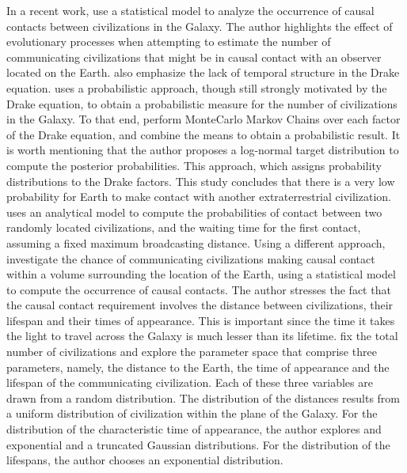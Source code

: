 In a recent work, \citep{balbi_impact_2018} use a statistical model to
analyze the occurrence of causal contacts between civilizations in the
Galaxy.
%
The author highlights the effect of evolutionary processes when
attempting to estimate the number of communicating civilizations that
might be in causal contact with an observer located on the Earth.
%
\citet{cirkovic_temporal_2004} also emphasize the lack of temporal
structure in the Drake equation.
%
\citet{bloetscher_using_2019} uses a probabilistic approach, though
still strongly motivated by the Drake equation, to obtain a
probabilistic measure for the number of civilizations in the Galaxy.
%
To that end, perform MonteCarlo Markov Chains over each factor of the
Drake equation, and combine the means to obtain a probabilistic
result.
%
It is worth mentioning that the author proposes a log-normal target
distribution to compute the posterior probabilities.
%
This approach, which assigns probability distributions to the Drake
factors.
%
This study concludes that there is a very low probability for Earth to
make contact with another extraterrestrial civilization.    
%
\citet{smith_broadcasting_2009} uses an analytical model to compute the
probabilities of contact between two randomly located civilizations,
and the waiting time for the first contact, assuming a fixed maximum
broadcasting distance.
% 
Using a different approach, 
\citet{balbi_impact_2018} investigate the chance of communicating
civilizations making causal contact within a volume surrounding the
location of the Earth, using a statistical model to compute the
occurrence of causal contacts.
%
The author stresses the fact that the
causal contact requirement involves the distance between
civilizations, their lifespan and their times of appearance.  This is
important since the time it takes the light to travel across the
Galaxy is much lesser than its lifetime.
%
\citet{balbi_impact_2018} fix the total number of civilizations and
explore the parameter space that comprise three parameters, namely,
the distance to the Earth, the time of appearance and the lifespan of
the communicating civilization.
%
Each of these three variables are drawn from a random distribution.
The distribution of the distances results from a uniform distribution
of civilization within the plane of the Galaxy.
%
For the distribution of the characteristic time of appearance, the
author explores and exponential and a truncated Gaussian
distributions. For the distribution of the lifespans, the author
chooses an exponential distribution.
%
